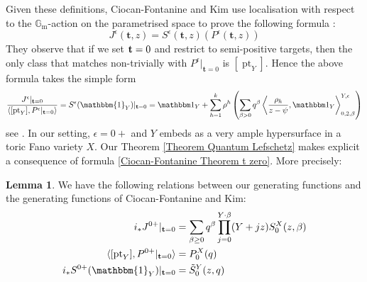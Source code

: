 \documentclass[10pt]{amsart}
\newcommand{\Gm}{\mathbb{G}_{\text{m}}}
\newcommand{\pt}{\operatorname{pt}}
\theoremstyle{definition}
\newtheorem{lem}[thm]{Lemma}
\theoremstyle{definition}
\begin{document}
Given these definitions, Ciocan-Fontanine and Kim use localisation with respect to the $\Gm$-action on the parametrised space to prove the following formula \cite[Theorem 5.4.1]{CF-K-wallcrossing}:
\[
 J^\epsilon(\mathbf{t},z)=S^\epsilon(\mathbf{t},z)(P^\epsilon(\mathbf{t},z))
\]
They observe that if we set ${\bf t}=0$ and restrict to semi-positive targets, then the only class that matches non-trivially with ${P^\epsilon}|_{\mathbf{t}=0}$ is $[\pt_Y]$. Hence the above formula takes the simple form
\begin{equation} \label{Ciocan-Fontanine Theorem t zero}
 \frac{J^\epsilon |_{{\bf t}=0}}{\langle [\pt_Y],  P^\epsilon|_{{\bf t}=0}\rangle}=S^\epsilon(\mathbbm{1}_Y)|_{\mathbf{t}=0} = \mathbbm 1_Y+\sum_{h=1}^k \rho^h \left(\sum_{\beta> 0}q^\beta\left\langle\frac{\rho_h}{z-\psi},\mathbbm 1_Y\right\rangle_{0,2,\beta}^{Y,\epsilon} \right)\end{equation}
see \cite[Corollary 5.5.1]{CF-K-wallcrossing}. In our setting, $\epsilon=0+$ and $Y$ embeds as a very ample hypersurface in a toric Fano variety $X$. Our Theorem \ref{Theorem Quantum Lefschetz} makes explicit a consequence of formula \eqref{Ciocan-Fontanine Theorem t zero}. More precisely:
\begin{lem} We have the following relations between our generating functions and the generating functions of Ciocan-Fontanine and Kim:
\begin{align}
\label{J epsilon equation} i_*J^{0+}|_{\mathbf{t}=0} & = \sum_{\beta \geq 0} q^\beta \prod_{j=0}^{Y \cdot \beta} (Y + jz) S_0^X(z,\beta) \\
\label{P epsilon equation} \langle [\pt_Y], P^{0+}|_{\mathbf{t}=0} \rangle & = P_0^X(q) \\
\label{S epsilon equation} i_*S^{0+}(\mathbbm{1}_Y)|_{\mathbf{t}=0} & = \tilde{S}^Y_0(z,q)
\end{align}
\end{lem}
\end{document}
